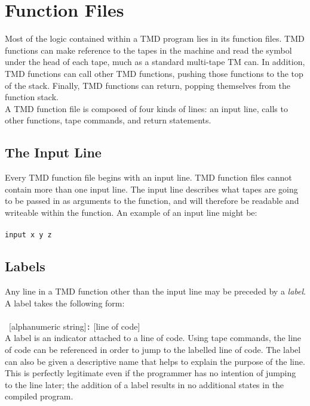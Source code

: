 \documentclass[11pt]{article}
\begin{document}
\section{Function Files}

Most of the logic contained within a TMD program lies in its function files. TMD functions can make reference to the tapes in the machine and read the symbol under the head of each tape, much as a standard multi-tape TM can. In addition, TMD functions can call other TMD functions, pushing those functions to the top of the stack. Finally, TMD functions can return, popping themselves from the function stack. \\

A TMD function file is composed of four kinds of lines: an input line, calls to other functions, tape commands, and return statements. 

\subsection{The Input Line}

Every TMD function file begins with an input line. TMD function files cannot contain more than one input line. The input line describes what tapes are going to be passed in as arguments to the function, and will therefore be readable and writeable within the function. An example of an input line might be: \\ \\
\texttt{input x y z}

\subsection{Labels}

Any line in a TMD function other than the input line may be preceded by a \emph{label}. A label takes the following form: \\ \\
~[alphanumeric string]\texttt{:} [line of code] \\

A label is an indicator attached to a line of code. Using tape commands, the line of code can be referenced in order to jump to the labelled line of code. The label can also be given a descriptive name that helps to explain the purpose of the line. This is perfectly legitimate even if the programmer has no intention of jumping to the line later; the addition of a label results in no additional states in the compiled program.
\end{document}
